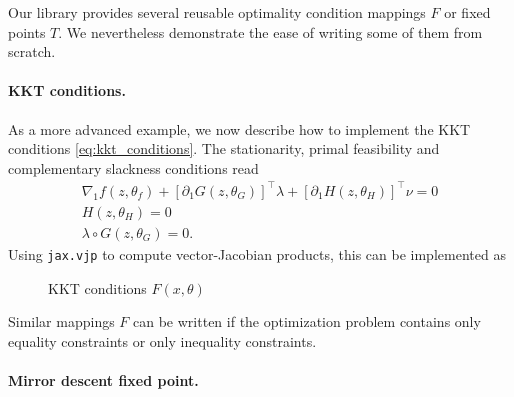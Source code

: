 \documentclass{article}
\begin{document}
Our library provides several reusable optimality condition mappings $F$ or fixed
points $T$. We nevertheless demonstrate the ease of writing some of
them from scratch.

\paragraph{KKT conditions.}

As a more advanced example, we now describe how to implement the KKT conditions
\eqref{eq:kkt_conditions}. The
stationarity, primal feasibility and complementary slackness conditions read
\begin{align}
\nabla_1 f(z, \theta_f) + [\partial_1 G(z, \theta_G)]^\top \lambda + 
[\partial_1 H(z, \theta_H)]^\top \nu = 0 \\
H(z, \theta_H) = 0 \\
\lambda \circ G(z, \theta_G) = 0.
\end{align}
Using \texttt{jax.vjp} to compute vector-Jacobian products, 
this can be implemented as
\begin{figure}[H]
\centering
{}
\caption{KKT conditions $F(x, \theta)$}
\label{fig:kkt_code}
\end{figure}
Similar mappings $F$ can be written if the optimization problem
contains only equality constraints or only inequality constraints.




\paragraph{Mirror descent fixed point.}
\end{document}
